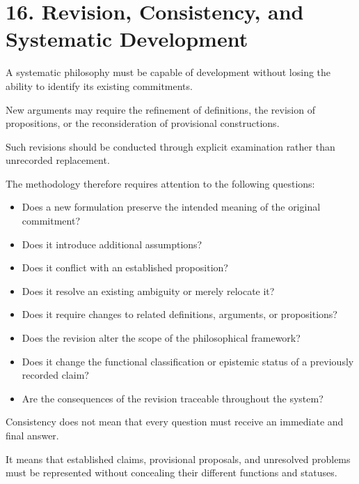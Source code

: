 \section*{16. Revision, Consistency, and Systematic Development}

A systematic philosophy must
be capable of development
without losing the ability
to identify its existing
commitments.

New arguments may require
the refinement of definitions,
the revision of propositions,
or the reconsideration of
provisional constructions.

Such revisions should be
conducted through explicit
examination rather than
unrecorded replacement.

The methodology therefore
requires attention to the
following questions:

\begin{itemize}

    \item Does a new formulation
    preserve the intended meaning
    of the original commitment?

    \item Does it introduce
    additional assumptions?

    \item Does it conflict with
    an established proposition?

    \item Does it resolve an
    existing ambiguity or
    merely relocate it?

    \item Does it require changes
    to related definitions,
    arguments, or propositions?

    \item Does the revision
    alter the scope of the
    philosophical framework?

    \item Does it change the
    functional classification
    or epistemic status of
    a previously recorded claim?

    \item Are the consequences
    of the revision traceable
    throughout the system?

\end{itemize}

Consistency does not mean
that every question must
receive an immediate and
final answer.

It means that established
claims, provisional proposals,
and unresolved problems must
be represented without
concealing their different
functions and statuses.

